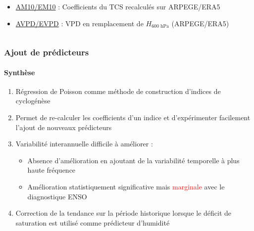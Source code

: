 \documentclass[aspectratio=169, usepdftitle=false, xcolor={dvipsnames}, 9pt,table]{beamer}
\begin{document}
\begin{frame}[t]
\begin{columns}
\begin{column}{0.3\textwidth}
\begin{examples}[Indices]
\begin{itemize}
                    \item \underline{AM10/EM10} : Coefficients du TCS recalculés sur ARPEGE/ERA5
                    \item \underline{AVPD/EVPD} : VPD en remplacement de $H_\text{600~hPa}$ (ARPEGE/ERA5) 
                \end{itemize}
            \end{examples}
            \vspace{1em}
        \end{column}
    \end{columns}
\end{frame}

\begin{frame}[c]
    \frametitle{Ajout de prédicteurs}
    \framesubtitle{Synthèse}
    \begin{block}[Synthèse]
        \small
        \begin{enumerate}
            \setlength\itemsep{1em}
            \item<1-> \alert{Régression de Poisson} comme méthode  de construction d'indices de cyclogénèse\\
            \item<2-> Permet de re-calculer les coefficients d'un indice et d'\alert{expérimenter} facilement l'ajout de nouveaux prédicteurs
            \item<3-> Variabilité interannuelle \alert{difficile} à améliorer :
                \begin{itemize}
                    \item Absence d'amélioration en ajoutant de la variabilité temporelle à plus haute fréquence
                    \item Amélioration statistiquement \alert{significative} mais \textcolor{red}{marginale} avec le diagnostique ENSO 
                \end{itemize}
            \item<4-> \alert{Correction} de la tendance sur la période historique lorsque le déficit de saturation est utilisé comme prédicteur d'humidité
        \end{enumerate}
    \end{block}
\end{frame}
\end{document}
